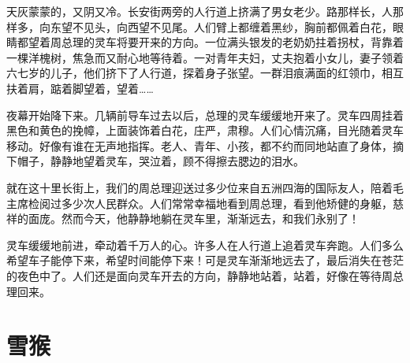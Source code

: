 \documentclass[12pt,UTF-8,openany]{ctexbook}
\begin{document}
\begin{large}
    
    天灰蒙蒙的，又阴又冷。长安街两旁的人行道上挤满了男女老少。路那样长，人那样多，向东望不见头，向西望不见尾。人们臂上都缠着黑纱，胸前都佩着白花，眼睛都望着周总理的灵车将要开来的方向。一位满头银发的老奶奶拄着拐杖，背靠着一棵洋槐树，焦急而又耐心地等待着。一对青年夫妇，丈夫抱着小女儿，妻子领着六七岁的儿子，他们挤下了人行道，探着身子张望。一群泪痕满面的红领巾，相互扶着肩，踮着脚望着，望着……
    
    夜幕开始降下来。几辆前导车过去以后，总理的灵车缓缓地开来了。灵车四周挂着黑色和黄色的挽幛，上面装饰着白花，庄严，肃穆。人们心情沉痛，目光随着灵车移动。好像有谁在无声地指挥。老人、青年、小孩，都不约而同地站直了身体，摘下帽子，静静地望着灵车，哭泣着，顾不得擦去腮边的泪水。
    
    就在这十里长街上，我们的周总理迎送过多少位来自五洲四海的国际友人，陪着毛主席检阅过多少次人民群众。人们常常幸福地看到周总理，看到他矫健的身躯，慈祥的面庞。然而今天，他静静地躺在灵车里，渐渐远去，和我们永别了！
    
    灵车缓缓地前进，牵动着千万人的心。许多人在人行道上追着灵车奔跑。人们多么希望车子能停下来，希望时间能停下来！可是灵车渐渐地远去了，最后消失在苍茫的夜色中了。人们还是面向灵车开去的方向，静静地站着，站着，好像在等待周总理回来。
    
\end{large}



\chapter{雪猴}
\end{document}
